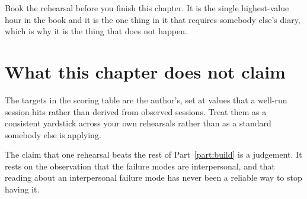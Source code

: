 \begin{drill}
Book the rehearsal before you finish this chapter. It is the single
highest-value hour in the book and it is the one thing in it that requires
somebody else's diary, which is why it is the thing that does not happen.
\end{drill}

\section*{What this chapter does not claim}

The targets in the scoring table are the author's, set at values that a
well-run session hits rather than derived from observed sessions. Treat them as
a consistent yardstick across your own rehearsals rather than as a standard
somebody else is applying.

The claim that one rehearsal beats the rest of Part~\ref{part:build} is a
judgement. It rests on the observation that the failure modes are
interpersonal, and that reading about an interpersonal failure mode has never
been a reliable way to stop having it.

